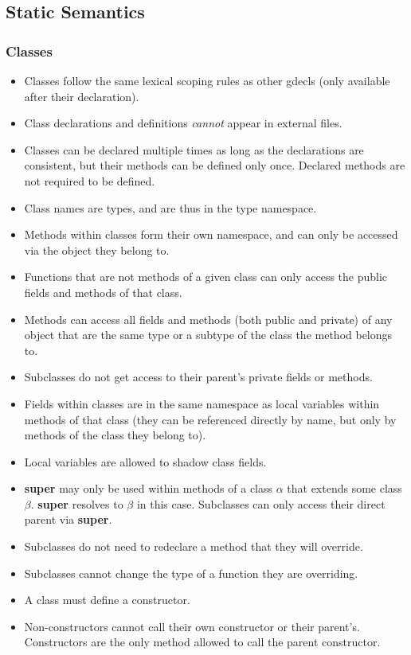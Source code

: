\documentclass{article}
\newcommand{\term}[1]{\textbf {#1}}
\begin{document}
\newpage
\subsection{Static Semantics}
\subsubsection{Classes}
\begin{itemize}
\item Classes follow the same lexical scoping rules as other gdecls (only
      available after their declaration).
\item Class declarations and definitions \emph{cannot} appear in external files.
\item Classes can be declared multiple times as long as the declarations are
      consistent, but their methods can be defined only once. Declared methods
      are not required to be defined.
\item Class names are types, and are thus in the type namespace.
\item Methods within classes form their own namespace, and can only be accessed
      via the object they belong to.
\item Functions that are not methods of a given class can only access the public
      fields and methods of that class.
\item Methods can access all fields and methods (both public and private) of any
      object that are the same type or a subtype of the class the method belongs to.
\item Subclasses do not get access to their parent's private fields or methods.
\item Fields within classes are in the same namespace as local variables within
      methods of that class (they can be referenced directly by name, but only
      by methods of the class they belong to).
\item Local variables are allowed to shadow class fields.
\item \term{super} may only be used within methods of a class $\alpha$ that
      extends some class $\beta$. \term{super} resolves to $\beta$ in this
      case. Subclasses can only access their direct parent via \term{super}.
\item Subclasses do not need to redeclare a method that they will override.
\item Subclasses cannot change the type of a function they are overriding.
\item A class must define a constructor.
\item Non-constructors cannot call their own constructor or their parent's.
      Constructors are the only method allowed to call the parent constructor.
\end{itemize}
\end{document}
